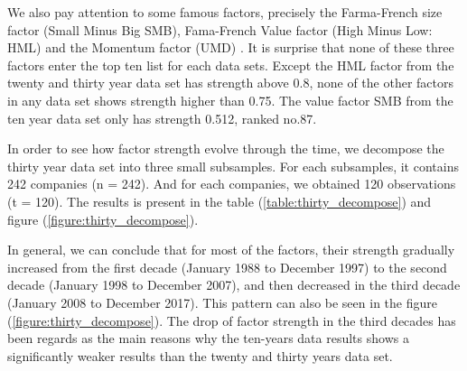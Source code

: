 
We also pay attention to some famous factors, precisely the Farma-French size factor (Small Minus Big SMB), Fama-French Value factor (High Minus Low: HML) \cite{Fama1992} and the Momentum factor (UMD) \cite{Carhart1997}.
It is surprise that none of these three factors enter the top ten list for each data sets.
Except the HML factor from the twenty and thirty year data set has strength above 0.8, none of the other factors in any data set shows strength higher than 0.75.
The value factor SMB from the ten year data set only has strength 0.512, ranked no.87.

In order to see how factor strength evolve through the time, we decompose the thirty year data set into three small subsamples.
For each subsamples, it contains 242 companies (n = 242). 
And for each companies, we obtained 120 observations (t = 120). 
The results is present in the table (\ref{table:thirty_decompose}) and figure (\ref{figure:thirty_decompose}).

In general, we can conclude that for most of the factors, their strength gradually increased from the first decade (January 1988 to December 1997) to the second decade (January 1998 to December 2007), and then decreased in the third decade (January 2008 to December 2017).
This pattern can also be seen in the figure (\ref{figure:thirty_decompose}).
The drop of factor strength in the third decades has been regards as the main reasons why the ten-years data results shows a significantly weaker results than the twenty and thirty years data set.

